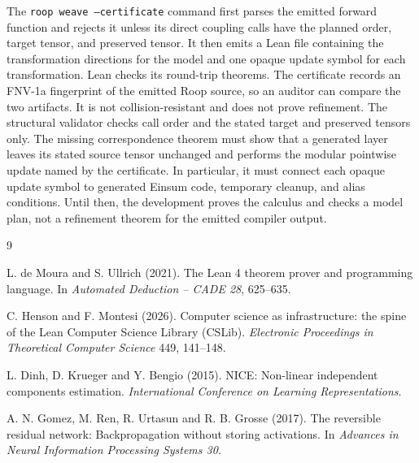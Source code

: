 \documentclass[aop,preprint]{../aop-template/imsart}
\theoremstyle{definition}
\begin{document}
The \texttt{roop weave --certificate} command first parses the emitted forward function and rejects it unless its direct coupling calls have the planned order, target tensor, and preserved tensor. It then emits a Lean file containing the transformation directions for the model and one opaque update symbol for each transformation. Lean checks its round-trip theorems. The certificate records an FNV-1a fingerprint of the emitted Roop source, so an auditor can compare the two artifacts. It is not collision-resistant and does not prove refinement. The structural validator checks call order and the stated target and preserved tensors only. The missing correspondence theorem must show that a generated layer leaves its stated source tensor unchanged and performs the modular pointwise update named by the certificate. In particular, it must connect each opaque update symbol to generated Einsum code, temporary cleanup, and alias conditions. Until then, the development proves the calculus and checks a model plan, not a refinement theorem for the emitted compiler output.

\begin{thebibliography}{9}

L. de Moura and S. Ullrich (2021).
The Lean 4 theorem prover and programming language.
In \textit{Automated Deduction -- CADE 28}, 625--635.

C. Henson and F. Montesi (2026).
Computer science as infrastructure: the spine of the Lean Computer Science Library (CSLib).
\textit{Electronic Proceedings in Theoretical Computer Science} 449, 141--148.

L. Dinh, D. Krueger and Y. Bengio (2015).
NICE: Non-linear independent components estimation.
\textit{International Conference on Learning Representations}.

A. N. Gomez, M. Ren, R. Urtasun and R. B. Grosse (2017).
The reversible residual network: Backpropagation without storing activations.
In \textit{Advances in Neural Information Processing Systems 30}.

\end{thebibliography}
\end{document}

